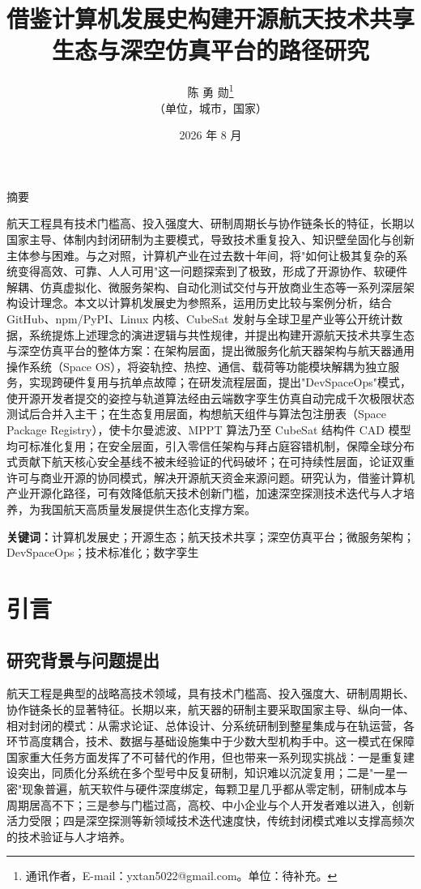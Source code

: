 \documentclass[UTF8,a4paper,zihao=-4]{ctexart}
\title{\heiti\LARGE 借鉴计算机发展史构建开源航天技术共享生态与深空仿真平台的路径研究}
\author{陈 勇 勋\thanks{通讯作者，E-mail：yxtan5022@gmail.com。单位：待补充。}\\
\small（单位，城市，国家）}
\date{2026 年 8 月}
\begin{document}
\maketitle
\vspace{-2em}

\begin{center}
{\large\heiti 摘\quad 要}
\end{center}
\noindent 航天工程具有技术门槛高、投入强度大、研制周期长与协作链条长的特征，长期以国家主导、体制内封闭研制为主要模式，导致技术重复投入、知识壁垒固化与创新主体参与困难。与之对照，计算机产业在过去数十年间，将"如何让极其复杂的系统变得高效、可靠、人人可用"这一问题探索到了极致，形成了开源协作、软硬件解耦、仿真虚拟化、微服务架构、自动化测试交付与开放商业生态等一系列深层架构设计理念。本文以计算机发展史为参照系，运用历史比较与案例分析，结合 GitHub、npm/PyPI、Linux 内核、CubeSat 发射与全球卫星产业等公开统计数据，系统提炼上述理念的演进逻辑与共性规律，并提出构建开源航天技术共享生态与深空仿真平台的整体方案：在架构层面，提出微服务化航天器架构与航天器通用操作系统（Space OS），将姿轨控、热控、通信、载荷等功能模块解耦为独立服务，实现跨硬件复用与抗单点故障；在研发流程层面，提出"DevSpaceOps"模式，使开源开发者提交的姿控与轨道算法经由云端数字孪生仿真自动完成千次极限状态测试后合并入主干；在生态复用层面，构想航天组件与算法包注册表（Space Package Registry），使卡尔曼滤波、MPPT 算法乃至 CubeSat 结构件 CAD 模型均可标准化复用；在安全层面，引入零信任架构与拜占庭容错机制，保障全球分布式贡献下航天核心安全基线不被未经验证的代码破坏；在可持续性层面，论证双重许可与商业开源的协同模式，解决开源航天资金来源问题。研究认为，借鉴计算机产业开源化路径，可有效降低航天技术创新门槛，加速深空探测技术迭代与人才培养，为我国航天高质量发展提供生态化支撑方案。

\vspace{0.5em}
\noindent\textbf{关键词：}计算机发展史；开源生态；航天技术共享；深空仿真平台；微服务架构；DevSpaceOps；技术标准化；数字孪生

\section{引言}
\subsection{研究背景与问题提出}
航天工程是典型的战略高技术领域，具有技术门槛高、投入强度大、研制周期长、协作链条长的显著特征。长期以来，航天器的研制主要采取国家主导、纵向一体、相对封闭的模式：从需求论证、总体设计、分系统研制到整星集成与在轨运营，各环节高度耦合，技术、数据与基础设施集中于少数大型机构手中。这一模式在保障国家重大任务方面发挥了不可替代的作用，但也带来一系列现实挑战：一是重复建设突出，同质化分系统在多个型号中反复研制，知识难以沉淀复用；二是"一星一密"现象普遍，航天软件与硬件深度绑定，每颗卫星几乎都从零定制，研制成本与周期居高不下；三是参与门槛过高，高校、中小企业与个人开发者难以进入，创新活力受限；四是深空探测等新领域技术迭代速度快，传统封闭模式难以支撑高频次的技术验证与人才培养。
\end{document}
